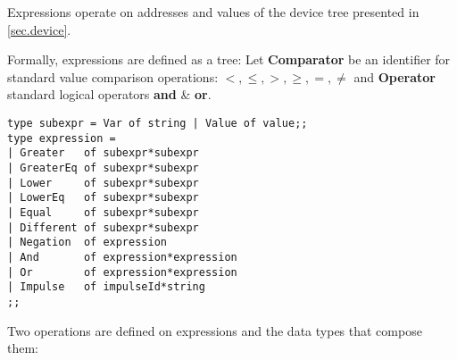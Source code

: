 \documentclass[applsci,article,submit,moreauthors,pdftex,10pt,a4paper]{mdpi}
\begin{document}
Expressions operate on addresses and values of the device tree presented in \ref{sec.device}.

Formally, expressions are defined as a tree:
Let \textbf{Comparator} be an identifier for standard value comparison operations: $<, \leq, >, \geq, =, \neq$ and \textbf{Operator} standard logical operators \textbf{and} \&  \textbf{or}.

\begin{lstlisting}
type subexpr = Var of string | Value of value;;
type expression =
| Greater   of subexpr*subexpr
| GreaterEq of subexpr*subexpr
| Lower     of subexpr*subexpr
| LowerEq   of subexpr*subexpr
| Equal     of subexpr*subexpr
| Different of subexpr*subexpr
| Negation  of expression
| And       of expression*expression
| Or        of expression*expression
| Impulse   of impulseId*string
;;
\end{lstlisting}
Two operations are defined on expressions and the data types that compose them: 

%    
%        
\end{document}
